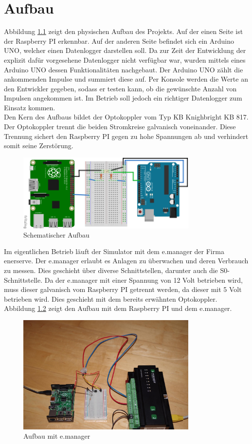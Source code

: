 \chapter{Aufbau}
Abbildung \ref{aufbau} zeigt den physischen Aufbau des Projekts. Auf der einen Seite ist der Raspberry PI erkennbar. Auf der anderen Seite befindet sich ein Arduino UNO, welcher einen Datenlogger darstellen soll. Da zur Zeit der Entwicklung der explizit dafür vorgesehene Datenlogger nicht verfügbar war, wurden mittels eines Arduino UNO dessen Funktionalitäten nachgebaut. Der Arduino UNO zählt die ankommenden Impulse und summiert diese auf. Per Konsole werden die Werte an den Entwickler gegeben, sodass er testen kann, ob die gewünschte Anzahl von Impulsen angekommen ist. Im Betrieb soll jedoch ein richtiger Datenlogger zum Einsatz kommen.\\
Den Kern des Aufbaus bildet der Optokoppler vom Typ KB Knighbright KB 817. Der Optokoppler trennt die beiden Stromkreise galvanisch voneinander. Diese Trennung sichert den Raspberry PI gegen zu hohe Spannungen ab und verhindert somit seine Zerstörung. 
\begin{figure}[H]
 	\centering
 	\includegraphics[width=0.8\textwidth]{bilder/aufbau.png}
 	\caption{Schematischer Aufbau}
	\label{aufbau}
\end{figure}
\noindent
Im eigentlichen Betrieb läuft der Simulator mit dem e.manager der Firma enerserve. Der e.manager erlaubt es Anlagen zu überwachen und deren Verbrauch zu messen. Dies geschieht über diverse Schnittstellen, darunter auch die S0-Schnittstelle. Da der e.manager mit einer Spannung von 12 Volt betrieben wird, muss dieser galvanisch vom Raspberry PI getrennt werden, da dieser mit 5 Volt betrieben wird. Dies geschieht mit dem bereits erwähnten Optokoppler. Abbildung \ref{emanager} zeigt den Aufbau mit dem Raspberry PI und dem e.manager.
 \begin{figure}[H]
 	\centering
 	\includegraphics[width=0.8\textwidth]{bilder/aufbau.jpg}
 	\caption{Aufbau mit e.manager}
 	\label{emanager}
 \end{figure}
